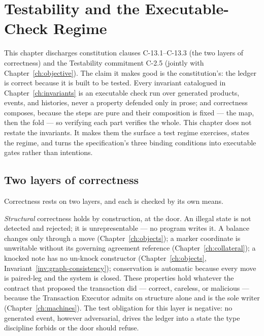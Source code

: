 \documentclass[11pt,a4paper]{article}
\begin{document}
\section{Testability and the Executable-Check Regime}\label{ch:testability}

This chapter discharges constitution clauses C-13.1--C-13.3 (the two layers of correctness) and the Testability commitment C-2.5 (jointly with Chapter~\ref{ch:objective}). The claim it makes good is the constitution's: the
ledger is correct because it is built to be tested. Every invariant catalogued in
Chapter~\ref{ch:invariants} is an executable check run over generated products, events, and
histories, never a property defended only in prose; and correctness composes, because the
steps are pure and their composition is fixed --- the map, then the fold --- so verifying
each part verifies the whole. This chapter does not restate the invariants. It makes them
the surface a test regime exercises, states the regime, and turns the specification's three
binding conditions into executable gates rather than intentions.

\subsection{Two layers of correctness}

Correctness rests on two layers, and each is checked by its own means.

\emph{Structural} correctness holds by construction, at the door. An illegal state is not
detected and rejected; it is unrepresentable --- no program writes it. A balance changes
only through a move (Chapter~\ref{ch:objects}); a marker coordinate is unwritable without
its governing agreement reference (Chapter~\ref{ch:collateral}); a knocked note has no
un-knock constructor (Chapter~\ref{ch:objects}, Invariant~\ref{inv:graph-consistency});
conservation is automatic because every move is paired-leg and the system is closed. These
properties hold whatever the contract that proposed the transaction did --- correct,
careless, or malicious --- because the Transaction Executor admits on structure alone and
is the sole writer (Chapter~\ref{ch:machines}). The test obligation for this layer is
negative: no generated event, however adversarial, drives the ledger into a state the type
discipline forbids or the door should refuse.
\end{document}
